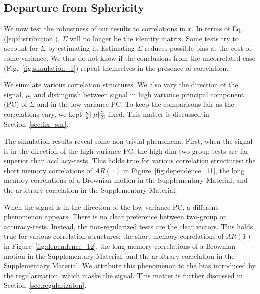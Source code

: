 \documentclass[]{bio}
\begin{document}
\subsection{Departure from Sphericity}
\label{sec:dependence}

We now test the robustness of our results to correlations in $x$. 
In terms of Eq.(\ref{eq:distribution}), $\Sigma$ will no longer be the identity matrix. 
Some tests try to account for $\Sigma$ by estimating it. 
Estimating $\Sigma$ reduces possible bias at the cost of some variance. 
We thus do not know if the conclusions from the uncorrelated case (Fig.~\ref{fig:simulation_1}) repeat themselves in the presence of correlation. 

We simulate various correlation structures.
We also vary the direction of the signal, $\mu$, and distinguish between signal in high variance principal component (PC) of $\Sigma$ and in the low variance PC. 
To keep the comparisons fair as the correlations vary, we kept $\frac{n}{2}\Vert \mu \Vert^2_\Sigma$ fixed.
This matter is discussed in Section~\ref{sec:fix_snr}.


The simulation results reveal some non trivial phenomena.
First, when the signal is in the direction of the high variance PC, the high-dim two-group tests are far superior than accl
acy-tests. 
This holds true for various correlation structures: the short memory correlations of $AR(1)$ in Figure~\ref{fig:dependence_11}, the long memory correlations of a Brownian motion in the Supplementary Material, and the arbitrary correlation in the Supplementary Material.

When the signal is in the direction of the low variance PC, a different phenomenon appears.
There is no clear preference between two-group or accuracy-tests.
Instead, the non-regularized tests are the clear victors. 
This holds true for various correlation structures: the short memory correlations of $AR(1)$ in Figure~\ref{fig:dependence_12}, the long memory correlations of a Brownian motion in the Supplementary Material, and the arbitrary correlation in the Supplementary Material.
We attribute this phenomenon to the bias introduced by the regularization, which masks the signal.
This matter is further discussed in Section~\ref{sec:regularizaton}.
\end{document}
